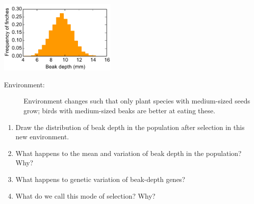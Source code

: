 \begin{frame}[t]
\begin{adjustwidth}{-1.5em}{-1.5em}
    \small
    \vspace{-0.3cm}
    \includegraphics[width=0.43\textwidth]{../images/my-beak-depth-histogram.pdf}

    \vspace{-0.2cm}
    \begin{description}
        \item[Environment:]
            Environment changes such that only plant species with medium-sized
            seeds grow; birds with medium-sized beaks are better at
            eating these.
    \end{description}

    \vspace{-0.2cm}
    \begin{enumerate}
        \item Draw the distribution of beak depth in the population after
            selection in this new environment.
        \item What happens to the mean and variation of beak depth in the
                population? Why?
        \item What happens to genetic variation of beak-depth genes?
        \item What do we call this mode of selection? Why?
    \end{enumerate}
\end{adjustwidth}
\end{frame}

